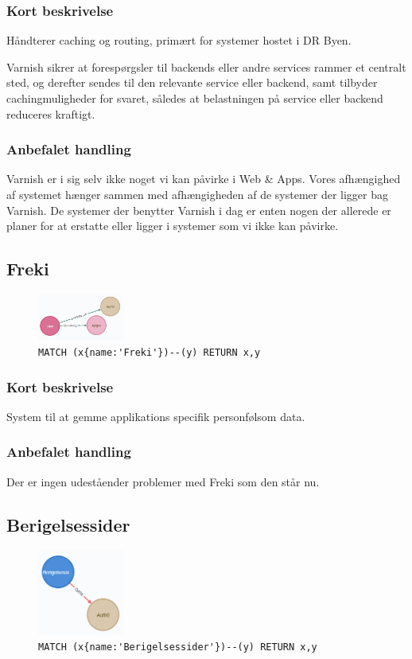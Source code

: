 \documentclass{article}
\begin{document}
\subsubsection*{Kort beskrivelse}
Håndterer caching og routing, primært for systemer hostet i DR Byen.

Varnish sikrer at forespørgsler til backends eller andre services rammer et centralt sted, og derefter sendes til den relevante service eller backend, samt tilbyder cachingmuligheder for svaret, således at belastningen på service eller backend reduceres kraftigt.
\subsubsection*{Anbefalet handling}
Varnish er i sig selv ikke noget vi kan påvirke i Web \& Apps. Vores afhængighed af systemet hænger sammen med afhængigheden af de systemer der ligger bag Varnish. 
De systemer der benytter Varnish i dag er enten nogen der allerede er planer for at erstatte eller ligger i systemer som vi ikke kan påvirke.


\subsection{Freki}
\begin{figure}[H]
\includegraphics[width=80pt]{Freki.PNG}
\cprotect\caption{\verb|MATCH (x{name:'Freki'})--(y) RETURN x,y|}
\end{figure}
\subsubsection*{Kort beskrivelse}
System til at gemme applikations specifik personfølsom data.
\subsubsection*{Anbefalet handling}
Der er ingen udeståender problemer med Freki som den står nu.



\subsection{Berigelsessider}
\begin{figure}[H]
\includegraphics[width=80pt]{Berigelsessider.PNG}
\cprotect\caption{\verb|MATCH (x{name:'Berigelsessider'})--(y) RETURN x,y|}
\end{figure}
\end{document}
